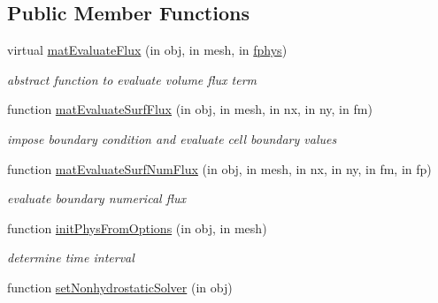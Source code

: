 \subsection*{Public Member Functions}
\begin{DoxyCompactItemize}
\item 
virtual \hyperlink{class_s_w_e_abstract2d_afa8846dd96e3975dc0069ab87831e0c9}{mat\+Evaluate\+Flux} (in obj, in mesh, in \hyperlink{class_ndg_phys_a6b25724fc9474d32018439009072f0a9}{fphys})
\begin{DoxyCompactList}\small\item\em abstract function to evaluate volume flux term \end{DoxyCompactList}\item 
function \hyperlink{class_s_w_e_abstract2d_ae5b55baded753812f4432d1a7b6225c4}{mat\+Evaluate\+Surf\+Flux} (in obj, in mesh, in nx, in ny, in fm)
\begin{DoxyCompactList}\small\item\em impose boundary condition and evaluate cell boundary values \end{DoxyCompactList}\item 
function \hyperlink{class_s_w_e_abstract2d_aa4ae645f3869a9f9e5255fd737368e23}{mat\+Evaluate\+Surf\+Num\+Flux} (in obj, in mesh, in nx, in ny, in fm, in fp)
\begin{DoxyCompactList}\small\item\em evaluate boundary numerical flux \end{DoxyCompactList}\item 
function \hyperlink{class_s_w_e_abstract2d_a269a11d526096bf8b3f461d6246fe21a}{init\+Phys\+From\+Options} (in obj, in mesh)
\begin{DoxyCompactList}\small\item\em determine time interval \end{DoxyCompactList}\item 
function \hyperlink{class_s_w_e_abstract2d_a7f363cfe463b8fdf4898cc33d78e5123}{set\+Nonhydrostatic\+Solver} (in obj)
\end{DoxyCompactItemize}
